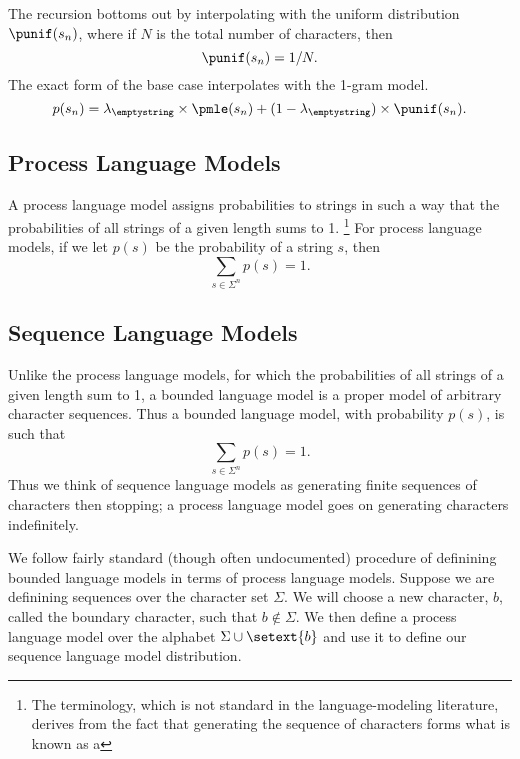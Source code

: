 The recursion bottoms out by interpolating with the uniform
distribution $\punif(s_n)$, where if $N$ is the total number
of characters, then 
%
\begin{equation}
\punif(s_n) = 1/N.
\end{equation}
%
The exact form of the base case interpolates with the 1-gram
model.
%
\begin{equation}
p(s_n) = \lambda_{\emptystring} \times \pmle(s_n)
+ (1 - \lambda_{\emptystring}) \times \punif(s_n).
\end{equation}


\subsection{Process Language Models}

A process language model assigns probabilities to strings
in such a way that the probabilities of all strings of a given
length sums to 1.%
%
\footnote{The terminology, which is not standard in the
  language-modeling literature, derives from the fact that generating
  the sequence of characters forms what is known as a }
%
For process language models, if we let $p(s)$ be the probability of a
string $s$, then
%
\begin{equation}
\sum_{s \in \Sigma^n} p(s) = 1.
\end{equation}
%


\subsection{Sequence Language Models}

Unlike the process language models, for which the probabilities of all
strings of a given length sum to 1, a bounded language model is a
proper model of arbitrary character sequences.  Thus a bounded
language model, with probability $p(s)$, is such that
%
\begin{equation}
\sum_{s \in \Sigma^n} p(s) = 1.\label{equation:lm-seq-norm}
\end{equation}
%
Thus we think of sequence language models as generating finite
sequences of characters then stopping; a process language model
goes on generating characters indefinitely.

We follow fairly standard (though often undocumented) procedure of
definining bounded language models in terms of process language
models.  Suppose we are definining sequences over the character set
$\Sigma$.  We will choose a new character, $b$, called the boundary
character, such that $b \not\in \Sigma$.  We then define a process
language model over the alphabet $\Sigma \cup \setext{b}$ and use it
to define our sequence language model distribution.

